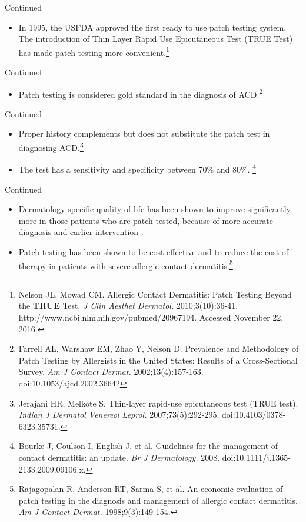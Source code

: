 \documentclass[11pt]{beamer}
\begin{document}
\begin{frame}{Continued}
\begin{itemize}
\item In 1995, the USFDA approved the first ready to use patch testing system. The introduction of Thin Layer Rapid Use Epicutaneous Test (TRUE Test) has made patch testing more convenient.\footnote{Nelson JL, Mowad CM. Allergic Contact Dermatitis: Patch Testing Beyond the \textbf{TRUE} Test. \textit{J Clin Aesthet Dermatol.} 2010;3(10):36-41. http://www.ncbi.nlm.nih.gov/pubmed/20967194. Accessed November 22, 2016.
}
\end{itemize}
\end{frame}

\begin{frame}{Continued}
\begin{itemize}
\item Patch testing is considered gold standard in the diagnosis of ACD.\footnote{Farrell AL, Warshaw EM, Zhao Y, Nelson D. Prevalence and Methodology of Patch Testing by Allergists in the United States: Results of a Cross-Sectional Survey. \textit{Am J Contact Dermat.} 2002;13(4):157-163. doi:10.1053/ajcd.2002.36642}
\end{itemize}
\end{frame}


\begin{frame}{Continued}
\begin{itemize}
\item Proper history complements but does not substitute the patch test in diagnosing ACD.\footnote{Jerajani HR, Melkote S. Thin-layer rapid-use epicutaneous test (TRUE test). \textit{Indian J Dermatol Venereol Leprol.} 2007;73(5):292-295. doi:10.4103/0378-6323.35731.
}
\item The test has a sensitivity and specificity between 70\% and 80\%. \footnote{Bourke J, Coulson I, English J, et al. Guidelines for the management of contact dermatitis: an update. \textit{Br J Dermatology.} 2008. doi:10.1111/j.1365-2133.2009.09106.x.
}

\end{itemize}
\end{frame}

\begin{frame}{Continued}
\begin{itemize}
\item Dermatology specific quality of life has been shown to improve significantly more in those patients who are patch tested, because of more accurate diagnosis and earlier intervention . 
\item Patch testing has been shown to be cost‐effective and to reduce the cost of therapy in patients with severe allergic contact dermatitis.\footnote{Rajagopalan R, Anderson RT, Sarma S, et al. An economic evaluation of patch testing in the diagnosis and management of allergic contact dermatitis. \textit{Am J Contact Dermat.} 1998;9(3):149-154.
}
\end{itemize}

\end{frame}
\end{document}
